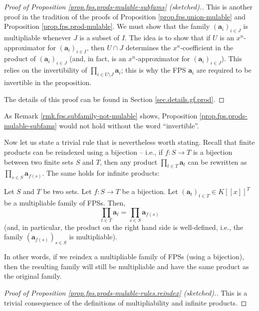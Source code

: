 \begin{proof}
[Proof of Proposition \ref{prop.fps.prods-mulable-subfams} (sketched).]This is
another proof in the tradition of the proofs of Proposition
\ref{prop.fps.union-mulable} and Proposition \ref{prop.fps.prod-mulable}. We
must show that the family $\left(  \mathbf{a}_{i}\right)  _{i\in J}$ is
multipliable whenever $J$ is a subset of $I$. The idea is to show that if $U$
is an $x^{n}$-approximator for $\left(  \mathbf{a}_{i}\right)  _{i\in I}$,
then $U\cap J$ determines the $x^{n}$-coefficient in the product of $\left(
\mathbf{a}_{i}\right)  _{i\in J}$ (and, in fact, is an $x^{n}$-approximator
for $\left(  \mathbf{a}_{i}\right)  _{i\in J}$). This relies on the
invertibility of $\prod_{i\in U\setminus J}\mathbf{a}_{i}$; this is why the
FPS $\mathbf{a}_{i}$ are required to be invertible in the proposition.

The details of this proof can be found in Section \ref{sec.details.gf.prod}.
\end{proof}

As Remark \ref{rmk.fps.subfamily-not-mulable} shows, Proposition
\ref{prop.fps.prods-mulable-subfams} would not hold without the word
\textquotedblleft invertible\textquotedblright. \medskip

Now let us state a trivial rule that is nevertheless worth stating. Recall
that finite products can be reindexed using a bijection -- i.e., if
$f:S\rightarrow T$ is a bijection between two finite sets $S$ and $T$, then
any product $\prod_{t\in T}\mathbf{a}_{t}$ can be rewritten as $\prod_{s\in
S}\mathbf{a}_{f\left(  s\right)  }$. The same holds for infinite products:

\begin{proposition}
\label{prop.fps.prods-mulable-rules.reindex}Let $S$ and $T$ be two sets. Let
$f:S\rightarrow T$ be a bijection. Let $\left(  \mathbf{a}_{t}\right)  _{t\in
T}\in K\left[  \left[  x\right]  \right]  ^{T}$ be a multipliable family of
FPSs. Then,
\[
\prod_{t\in T}\mathbf{a}_{t}=\prod_{s\in S}\mathbf{a}_{f\left(  s\right)  }%
\]
(and, in particular, the product on the right hand side is well-defined, i.e.,
the family $\left(  \mathbf{a}_{f\left(  s\right)  }\right)  _{s\in S}$ is multipliable).
\end{proposition}

In other words, if we reindex a multipliable family of FPSs (using a
bijection), then the resulting family will still be multipliable and have the
same product as the original family.

\begin{proof}
[Proof of Proposition \ref{prop.fps.prods-mulable-rules.reindex}
(sketched).]This is a trivial consequence of the definitions of
multipliability and infinite products.
\end{proof}

